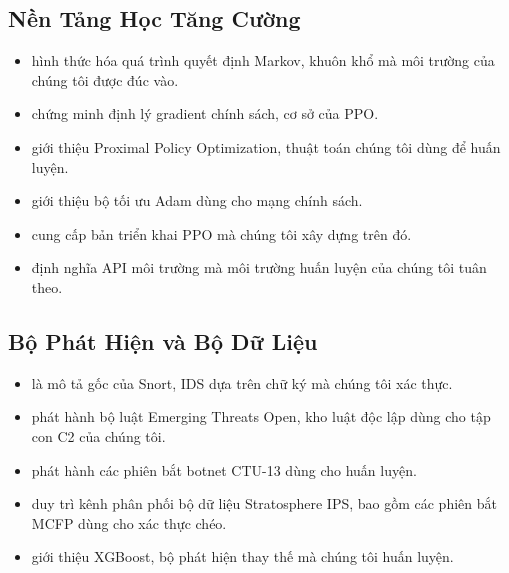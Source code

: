 \documentclass[12pt,a4paper]{report}
\begin{document}
\subsection{Nền Tảng Học Tăng Cường}

\begin{itemize}
  \item \citet{puterman1994markov} hình thức hóa quá trình quyết định Markov, khuôn khổ mà môi trường của chúng tôi được đúc vào.
  
  \item \citet{sutton2000policy} chứng minh định lý gradient chính sách, cơ sở của PPO.
  
  \item \citet{schulman2017proximal} giới thiệu Proximal Policy Optimization, thuật toán chúng tôi dùng để huấn luyện.
  
  \item \citet{kingma2014adam} giới thiệu bộ tối ưu Adam dùng cho mạng chính sách.
  
  \item \citet{stable_baselines3} cung cấp bản triển khai PPO mà chúng tôi xây dựng trên đó.
  
  \item \citet{gymnasium} định nghĩa API môi trường mà môi trường huấn luyện của chúng tôi tuân theo.
\end{itemize}

\subsection{Bộ Phát Hiện và Bộ Dữ Liệu}

\begin{itemize}
  \item \citet{snort_project} là mô tả gốc của Snort, IDS dựa trên chữ ký mà chúng tôi xác thực.
  
  \item \citet{emerging_threats} phát hành bộ luật Emerging Threats Open, kho luật độc lập dùng cho tập con C2 của chúng tôi.
  
  \item \citet{stratosphere_ctu13} phát hành các phiên bắt botnet CTU-13 dùng cho huấn luyện.
  
  \item \citet{ctu_datasets} duy trì kênh phân phối bộ dữ liệu Stratosphere IPS, bao gồm các phiên bắt MCFP dùng cho xác thực chéo.
  
  \item \citet{chen2016xgboost} giới thiệu XGBoost, bộ phát hiện thay thế mà chúng tôi huấn luyện.
\end{itemize}
\end{document}
